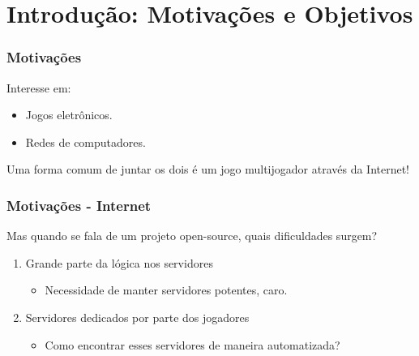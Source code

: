 \documentclass[brazil]{beamer}
\begin{document}
\section{Introdução: Motivações e Objetivos}
\begin{frame}[fragile]
  \frametitle{Motivações}
  Interesse em:
  \begin{itemize}
    \item Jogos eletrônicos.
    \item Redes de computadores.
  \end{itemize}
  \pause
  \vspace{30pt}
  Uma forma comum de juntar os dois é um jogo multijogador através da Internet!
\end{frame}
\begin{frame}[fragile]
  \frametitle{Motivações - Internet}
  Mas quando se fala de um projeto open-source, quais dificuldades surgem?
  \pause
  \vspace{10pt}
  \begin{enumerate}
    \item Grande parte da lógica nos servidores
        \pause
        \begin{itemize} \item Necessidade de manter servidores potentes, caro. \end{itemize}
    \pause
    \vspace{10pt}
    \item Servidores dedicados por parte dos jogadores
        \pause
        \begin{itemize} \item Como encontrar esses servidores de maneira automatizada? \end{itemize}
  \end{enumerate}

\end{frame}
\end{document}
